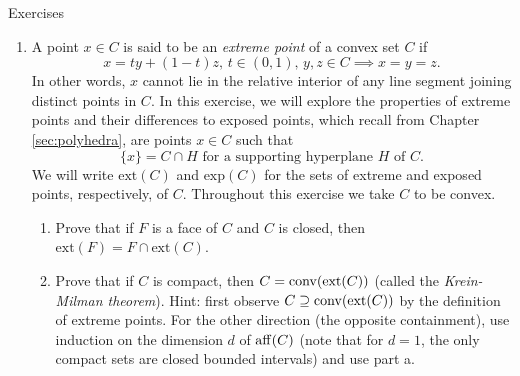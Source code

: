 \begin{xcb}{Exercises}
\begin{enumerate}[label=\thechapter.\arabic*]
\begin{enumerate}[label=\alph*.]
\item First, show that the conditions $L>0$, $m>0$ in the theorems are
  not necessary, in the sense that the stated results still hold when $L=0$ and  
  $m=0$. Hint: what is a Lipschitz smooth function with $L=0$? What is a 
  strongly convex function with $m=0$?

\item Next, show that each of the latter four statements, (ii)--(v), in Theorem  
  \ref{thm:strong_convexity} imply that $f$ is convex (meaning, convexity is 
  implicit in all of the equivalences/implications). 

\item Now, show that convexity is \emph{not} implied by any one of the five  
  statements, (i)--(v), in Theorem \ref{thm:lipschitz_smoothness}. 

\item Lastly, show that convexity of $f$ is indeed necessary for equating (i)
  with the rest of the statements in Theorem \ref{thm:lipschitz_smoothness}:
  give an example of a nonconvex function that satisfies one of (ii)--(v), but
  not (i).  
\end{enumerate}
 
\item \label{ex:extreme_points}
  A point $x \in C$ is said to be an \emph{extreme point} of a convex set $C$ if 
  \[
  x = t y + (1-t) z, \, t \in (0,1), \, y,z \in C \implies x = y = z.
  \]
  In other words, $x$ cannot lie in the relative interior of any line segment
  joining distinct points in $C$. In this exercise, we will explore the
  properties of extreme points and their differences to exposed points, which
  recall from Chapter \ref{sec:polyhedra}, are points $x \in C$ such that  
  \[
  \text{$\{x\} = C \cap H$ for a supporting hyperplane $H$ of $C$}.
  \]
  We will write $\mathrm{ext}(C)$ and $\mathrm{exp}(C)$ for the sets of extreme
  and exposed points, respectively, of $C$. Throughout this exercise we take $C$ 
  to be convex.

\begin{enumerate}[label=\alph*.]
\item Prove that if $F$ is a face of $C$ and $C$ is closed, then
  $\mathrm{ext}(F) = F \cap \mathrm{ext}(C)$. 

\item Prove that if $C$ is compact, then $C = \operatorname{conv}(\mathrm{ext}(C))$ (called
  the \emph{Krein-Milman theorem}). Hint: first observe $C \supseteq
  \operatorname{conv}(\mathrm{ext}(C))$ by the definition of extreme points. For the other
  direction (the opposite containment), use induction on the dimension $d$ of
  $\operatorname{aff}(C)$ (note that for $d=1$, the only compact sets are closed bounded
  intervals) and use part a.   


\end{enumerate}
\end{enumerate}
\end{xcb}
